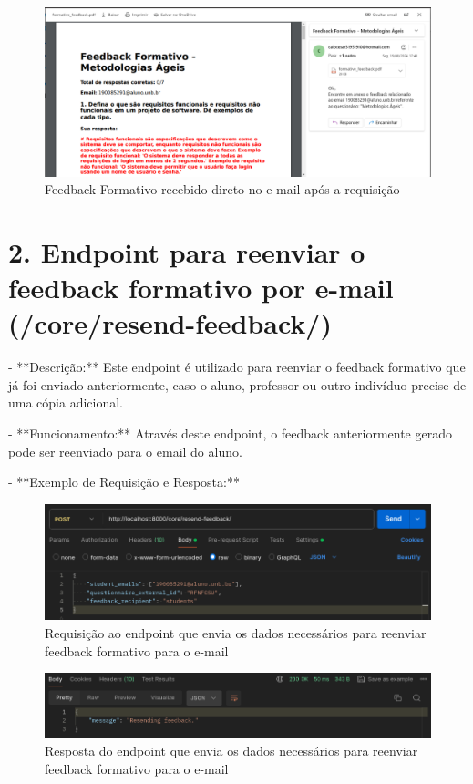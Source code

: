 \begin{figure}[H]
    \centering
    \includegraphics[width=1\textwidth]{figuras/feedback.png}
    \caption{Feedback Formativo recebido direto no e-mail após a requisição}
    \label{fig:report_questions}
\end{figure}

\section*{2. Endpoint para reenviar o feedback formativo por e-mail (/core/resend-feedback/)}

- **Descrição:** Este endpoint é utilizado para reenviar o feedback formativo que já foi enviado anteriormente, caso o aluno, professor ou outro indivíduo precise de uma cópia adicional.

- **Funcionamento:** Através deste endpoint, o feedback anteriormente gerado pode ser reenviado para o email do aluno.

- **Exemplo de Requisição e Resposta:**

\begin{figure}[H]
    \centering
    \includegraphics[width=1\textwidth]{figuras/resend_report.png}
    \caption{Requisição ao endpoint que envia os dados necessários para reenviar feedback formativo para o e-mail}
    \label{fig:report_questions}
\end{figure}

\begin{figure}[H]
    \centering
    \includegraphics[width=1\textwidth]{figuras/resend_report_result.png}
    \caption{Resposta do endpoint que envia os dados necessários para reenviar feedback formativo para o e-mail}
    \label{fig:report_questions}
\end{figure}

